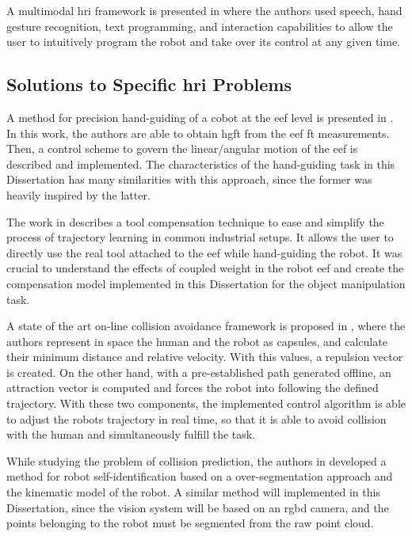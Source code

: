\par A multimodal \ac{hri} framework is presented in \cite{colab.multimodal} where the authors used speech, hand gesture recognition, text programming, and interaction capabilities to allow the user to intuitively program the robot and take over its control at any given time. 

\subsection{Solutions to Specific \acs{hri} Problems}

\par A method for precision hand-guiding of a cobot at the \ac{eef} level is presented in \cite{spec.handguide}. In this work, the authors are able to obtain \ac{hgft} from the \ac{eef} \ac{ft} measurements. Then, a control scheme to govern the linear/angular motion of the \ac{eef} is described and implemented. The characteristics of the hand-guiding task in this Dissertation has many similarities with this approach, since the former was heavily inspired by the latter.

\par The work in \cite{spec.compensation} describes a tool compensation technique to ease and simplify the process of trajectory learning in common industrial setups. It allows the user to directly use the real tool attached to the \ac{eef} while hand-guiding the robot. It was crucial to understand the effects of coupled weight in the robot \ac{eef} and create the compensation model implemented in this Dissertation for the object manipulation task.

\par A state of the art on-line collision avoidance framework is proposed in \cite{spec.collision}, where the authors represent in space the human and the robot as capsules, and calculate their minimum distance and relative velocity. With this values, a repulsion vector is created. On the other hand, with a pre-established path generated offline, an attraction vector is computed and forces the robot into following the defined trajectory. With these two components, the implemented control algorithm is able to adjust the robots trajectory in real time, so that it is able to avoid collision with the human and simultaneously fulfill the task.

\par While studying the problem of collision prediction, the authors in \cite{spec.selfidentification} developed a method for robot self-identification based on a over-segmentation approach and the kinematic model of the robot. A similar method will implemented in this Dissertation, since the vision system will be based on an \acs{rgbd} camera, and the points belonging to the robot must be segmented from the raw point cloud.

